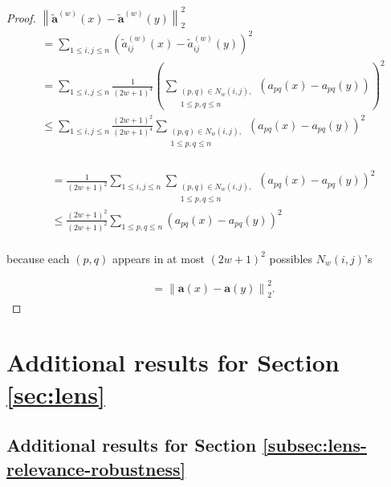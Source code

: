 \documentclass[letterpaper]{article} %
\def\ba{\mathbf{a}}
\newcommand{\norm}[1]{\left\|#1\right\|}
\begin{document}
\begin{proof}

$\norm{\tilde{\ba}^{(w)}(x) - \tilde{\ba}^{(w)}(y)}_{2}^{2}$ 
\begin{align*}
&= \sum_{1 \leq i, j \leq n} \left(\tilde{a}_{ij}^{(w)}(x) - \tilde{a}_{ij}^{(w)}(y)\right)^{2} \\ 
& = \sum_{1 \leq i, j \leq n} \frac{1}{(2w+1)^{4}} \left(\sum_{\substack{(p, q) \in N_{w}(i, j), \\ 1 \leq p, q \leq n}} \left(a_{pq}(x) - a_{pq}(y)\right)\right)^{2} \\
& \leq \sum_{1 \leq i, j \leq n} \frac{(2w+1)^{2}}{(2w+1)^{4}} \sum_{\substack{(p, q) \in N_{w}(i, j), \\ 1 \leq p, q \leq n}} \left(a_{pq}(x) - a_{pq}(y)\right)^{2}~ 
\end{align*}
 \\

\begin{align*}
& = \frac{1}{(2w+1)^{2}} \sum_{1 \leq i, j \leq n} \sum_{\substack{(p, q) \in N_{w}(i, j), \\ 1 \leq p, q \leq n}} \left(a_{pq}(x) - a_{pq}(y)\right)^{2} \\
& \leq \frac{(2w+1)^{2}}{(2w+1)^{2}} \sum_{1 \leq p, q \leq n} \left(a_{pq}(x) - a_{pq}(y)\right)^{2} \\
& \qquad 
\end{align*}

because each $(p, q)$ appears in at most $(2w+1)^{2}$ possibles $N_{w}(i, j)$'s

\begin{align*}
& = \norm{\ba(x) - \ba(y)}_{2}^{2}.
\end{align*}
\end{proof}


\section{Additional results for Section \ref{sec:lens}} \label{app:more-lens-results}

\subsection{Additional results for Section \ref{subsec:lens-relevance-robustness}} \label{app:vary-k-sp-ken}
\end{document}
